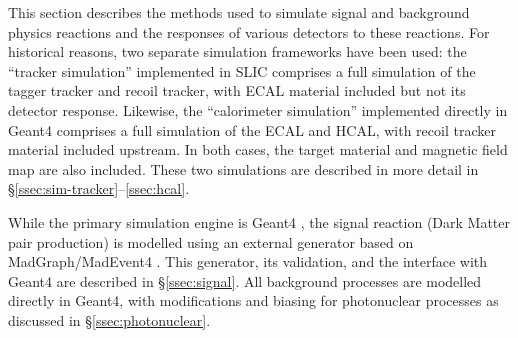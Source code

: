 
This section describes the methods used to simulate signal and background physics reactions and the responses of various detectors to these reactions.  
For historical reasons, two separate simulation frameworks have been used: the ``tracker simulation'' implemented in SLIC comprises a full simulation of the tagger tracker and recoil tracker, with ECAL material included but not its detector response.  Likewise, the ``calorimeter simulation'' implemented directly in Geant4 comprises a full simulation of the ECAL and HCAL, with recoil tracker material included upstream. In both cases, the target material and magnetic field map are also included.  These two simulations are described in more detail in \S\ref{ssec:sim-tracker}--\ref{ssec:hcal}.

While the primary simulation engine is Geant4 \cite{g4}, the signal reaction (Dark Matter pair production) is modelled using an external generator based on MadGraph/MadEvent4 \cite{MG4}.  This generator, its validation, and the interface with Geant4 are described in \S\ref{ssec:signal}.  All background processes are modelled directly in Geant4, with modifications and biasing for photonuclear processes as discussed in \S\ref{ssec:photonuclear}.